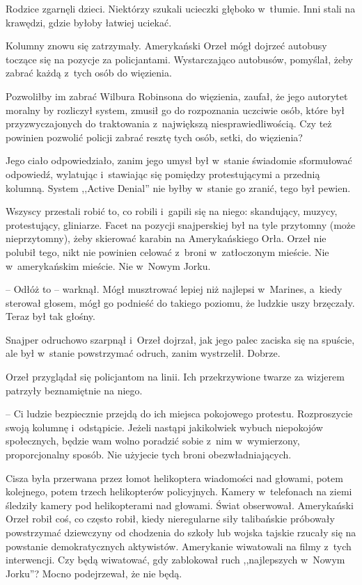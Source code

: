 \documentclass[oneside,polish,11pt,sfheadings]{mwbk}
\begin{document}
Rodzice zgarnęli dzieci. Niektórzy szukali ucieczki głęboko w~tłumie.
Inni stali na krawędzi, gdzie byłoby łatwiej uciekać.

Kolumny znowu się zatrzymały. Amerykański Orzeł mógł dojrzeć autobusy
toczące się na pozycje za policjantami. Wystarczająco autobusów,
pomyślał, żeby zabrać każdą z~tych osób do więzienia.

Pozwoliłby im zabrać Wilbura Robinsona do więzienia, zaufał, że jego
autorytet moralny by rozliczył system, zmusił go do rozpoznania uczciwie
osób, które był przyzwyczajonych do traktowania z~największą
niesprawiedliwością. Czy też powinien pozwolić policji zabrać resztę
tych osób, setki, do więzienia?

Jego ciało odpowiedziało, zanim jego umysł był w~stanie świadomie
sformułować odpowiedź, wylatując i~stawiając się pomiędzy protestującymi
a przednią kolumną. System ,,Active Denial'' nie byłby w~stanie go
zranić, tego był pewien.

Wszyscy przestali robić to, co robili i~gapili się na niego: skandujący,
muzycy, protestujący, gliniarze. Facet na pozycji snajperskiej był na
tyle przytomny (może nieprzytomny), żeby skierować karabin na
Amerykańskiego Orła. Orzeł nie polubił tego, nikt nie powinien celować z~broni w~zatłoczonym mieście. Nie w~amerykańskim mieście. Nie w~Nowym
Jorku.

-- Odłóż to -- warknął. Mógł musztrować lepiej niż najlepsi w~Marines, a~kiedy sterował głosem, mógł go podnieść do takiego poziomu, że ludzkie
uszy brzęczały. Teraz był tak głośny.

Snajper odruchowo szarpnął i~Orzeł dojrzał, jak jego palec zaciska się
na spuście, ale był w~stanie powstrzymać odruch, zanim wystrzelił.
Dobrze.

Orzeł przyglądał się policjantom na linii. Ich przekrzywione twarze za
wizjerem patrzyły beznamiętnie na niego. 

-- Ci ludzie bezpiecznie przejdą
do ich miejsca pokojowego protestu. Rozproszycie swoją kolumnę i~odstąpicie. Jeżeli nastąpi jakikolwiek wybuch niepokojów społecznych,
będzie wam wolno poradzić sobie z~nim w~wymierzony, proporcjonalny
sposób. Nie użyjecie tych broni obezwładniających.

Cisza była przerwana przez łomot helikoptera wiadomości nad głowami,
potem kolejnego, potem trzech helikopterów policyjnych. Kamery w~telefonach na ziemi śledziły kamery pod helikopterami nad głowami. Świat
obserwował. Amerykański Orzeł robił coś, co często robił, kiedy
nieregularne siły talibańskie próbowały powstrzymać dziewczyny od
chodzenia do szkoły lub wojska tajskie rzucały się na powstanie
demokratycznych aktywistów. Amerykanie wiwatowali na filmy z~tych
interwencji. Czy będą wiwatować, gdy zablokował ruch ,,najlepszych w~Nowym Jorku''? Mocno podejrzewał, że nie będą.
\end{document}
